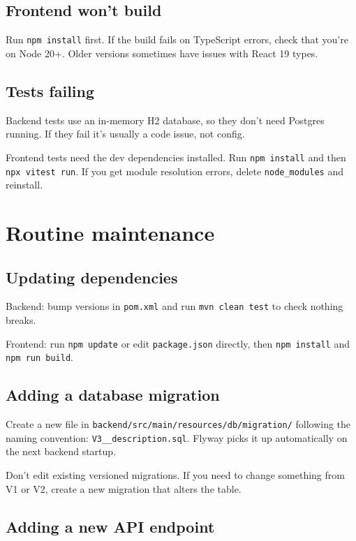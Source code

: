 \documentclass[a4paper,11pt]{article}
\begin{document}
\subsection{Frontend won't build}

Run \texttt{npm install} first. If the build fails on TypeScript errors, check that you're on Node 20+. Older versions sometimes have issues with React 19 types.

\subsection{Tests failing}

Backend tests use an in-memory H2 database, so they don't need Postgres running. If they fail it's usually a code issue, not config.

Frontend tests need the dev dependencies installed. Run \texttt{npm install} and then \texttt{npx vitest run}. If you get module resolution errors, delete \texttt{node\_modules} and reinstall.

\section{Routine maintenance}

\subsection{Updating dependencies}

Backend: bump versions in \texttt{pom.xml} and run \texttt{mvn clean test} to check nothing breaks.

Frontend: run \texttt{npm update} or edit \texttt{package.json} directly, then \texttt{npm install} and \texttt{npm run build}.

\subsection{Adding a database migration}

Create a new file in \texttt{backend/src/main/resources/db/migration/} following the naming convention: \texttt{V3\_\_description.sql}. Flyway picks it up automatically on the next backend startup.

Don't edit existing versioned migrations. If you need to change something from V1 or V2, create a new migration that alters the table.

\subsection{Adding a new API endpoint}
\end{document}
